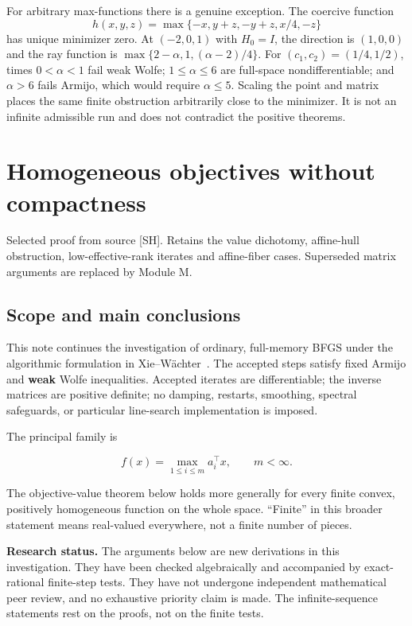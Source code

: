 \documentclass[10pt,oneside,openany]{book}
\newcommand{\ModuleTag}{I}
\theoremstyle{remark}\newtheorem{remark}{Remark}[chapter]
\newcommand{\StartModule}[3]{\cleardoublepage\renewcommand{\ModuleTag}{#1}\chapter{#2}\label{#1:chapter}\begin{small}\color{Accent}#3\end{small}\par\vspace{3pt}{\color{RuleGray}\hrule}\vspace{9pt}}
\begin{document}
For arbitrary max-functions there is a genuine exception. The coercive function
\[
 h(x,y,z)=\max\{-x,y+z,-y+z,x/4,-z\}
\]
has unique minimizer zero. At $(-2,0,1)$ with $H_0=I$, the direction is $(1,0,0)$ and the ray function is $\max\{2-\alpha,1,(\alpha-2)/4\}$. For $(c_1,c_2)=(1/4,1/2)$, times $0<\alpha<1$ fail weak Wolfe; $1\le\alpha\le6$ are full-space nondifferentiable; and $\alpha>6$ fails Armijo, which would require $\alpha\le5$. Scaling the point and matrix places the same finite obstruction arbitrarily close to the minimizer. It is not an infinite admissible run and does not contradict the positive theorems.


\StartModule{H}{Homogeneous objectives without compactness}{Selected proof from source [SH]. Retains the value dichotomy, affine-hull obstruction, low-effective-rank iterates and affine-fiber cases. Superseded matrix arguments are replaced by Module M.}

\begingroup

\setcounter{section}{0}
\setcounter{theorem}{0}
\setcounter{lemma}{0}
\setcounter{corollary}{0}
\setcounter{proposition}{0}
\setcounter{remark}{0}
\setcounter{equation}{0}
\section{Scope and main
conclusions}\label{H:scope-and-main-conclusions}

This note continues the investigation of ordinary, full-memory BFGS
under the algorithmic formulation in Xie--W\"achter~\cite{XW}. The accepted
steps satisfy fixed Armijo and \textbf{weak} Wolfe inequalities.
Accepted iterates are differentiable; the inverse matrices are positive
definite; no damping, restarts, smoothing, spectral safeguards, or
particular line-search implementation is imposed.

The principal family is

\[
f(x)=\max_{1\le i\le m}a_i^\top x,\qquad m<\infty.
\]

The objective-value theorem below holds more generally for every finite
convex, positively homogeneous function on the whole space. ``Finite''
in this broader statement means real-valued everywhere, not a finite
number of pieces.

\textbf{Research status.} The arguments below are new derivations in
this investigation. They have been checked algebraically and accompanied
by exact-rational finite-step tests. They have not undergone independent
mathematical peer review, and no exhaustive priority claim is made. The
infinite-sequence statements rest on the proofs, not on the finite
tests.
\end{document}
